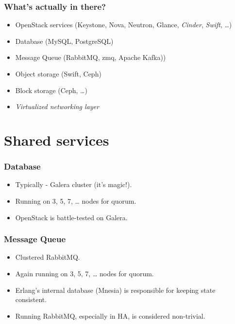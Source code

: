 \documentclass[aspectratio=169]{beamer}
\begin{document}
\begin{frame}
    \frametitle{What's actually in there?}
    \begin{center}
        \begin{itemize}
            \pause
            \item OpenStack services (Keystone, Nova, Neutron, Glance, \emph{Cinder}, \emph{Swift}, …)
            \pause
            \item Database (MySQL, PostgreSQL)
            \pause
            \item Message Queue (RabbitMQ, zmq, Apache Kafka))
            \pause
            \item Object storage (Swift, Ceph)
            \pause
            \item Block storage (Ceph, …)
            \pause
            \item \emph{Virtualized networking layer}
        \end{itemize}
    \end{center}
\end{frame}

\section{Shared services}

\begin{frame}
    \frametitle{Database}
    \begin{center}
        \begin{itemize}
            \item Typically - Galera cluster (it's magic!).
            \item Running on 3, 5, 7, … nodes for quorum.
            \item OpenStack is battle-tested on Galera.
        \end{itemize}
    \end{center}
\end{frame}

\begin{frame}
    \frametitle{Message Queue}
    \begin{center}
        \begin{itemize}
            \item Clustered RabbitMQ.
            \item Again running on 3, 5, 7, … nodes for quorum.
            \item Erlang's internal database (Mnesia) is responsible for keeping state consistent.
            \item Running RabbitMQ, especially in HA, is considered non-trivial.
        \end{itemize}
    \end{center}
\end{frame}
\end{document}
